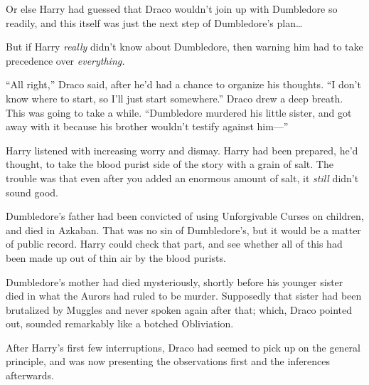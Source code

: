 Or else Harry had guessed that Draco wouldn’t join up with Dumbledore so readily, and this itself was just the next step of Dumbledore’s plan…

But if Harry \emph{really} didn’t know about Dumbledore, then warning him had to take precedence over \emph{everything.}

“All right,” Draco said, after he’d had a chance to organize his thoughts. “I don’t know where to start, so I’ll just start somewhere.” Draco drew a deep breath. This was going to take a while. “Dumbledore murdered his little sister, and got away with it because his brother wouldn’t testify against him—”

\later

Harry listened with increasing worry and dismay. Harry had been prepared, he’d thought, to take the blood purist side of the story with a grain of salt. The trouble was that even after you added an enormous amount of salt, it \emph{still} didn’t sound good.

Dumbledore’s father had been convicted of using Unforgivable Curses on children, and died in Azkaban. That was no sin of Dumbledore’s, but it would be a matter of public record. Harry could check that part, and see whether all of this had been made up out of thin air by the blood purists.

Dumbledore’s mother had died mysteriously, shortly before his younger sister died in what the Aurors had ruled to be murder. Supposedly that sister had been brutalized by Muggles and never spoken again after that; which, Draco pointed out, sounded remarkably like a botched Obliviation.

After Harry’s first few interruptions, Draco had seemed to pick up on the general principle, and was now presenting the observations first and the inferences afterwards.

